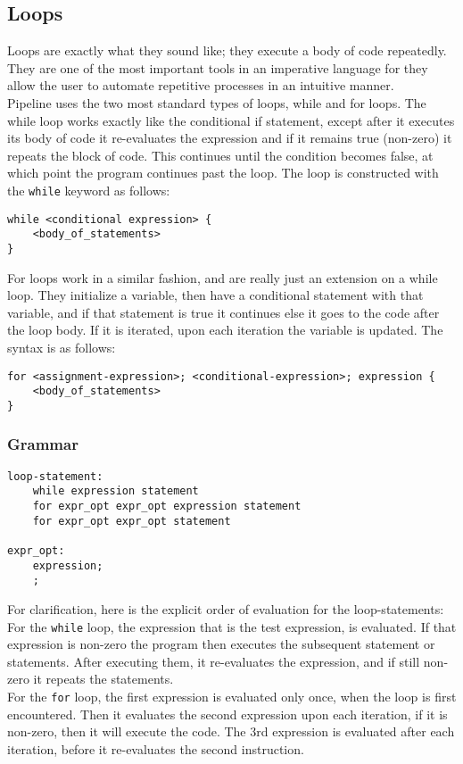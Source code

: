 \documentclass[./LRM_main.tex]{subfiles}
\begin{document}
\subsection{Loops}
Loops are exactly what they sound like; they execute a body of code repeatedly. They are one of the most important tools in an imperative language for they allow the user to automate repetitive processes in an intuitive manner.\\
Pipeline uses the two most standard types of loops, while and for loops. The while loop works exactly like the conditional if statement, except after it executes its body of code it re-evaluates the expression and if it remains true (non-zero) it repeats the block of code. This continues until the condition becomes false, at which point the program continues past the loop. The loop is constructed with the \texttt{while} keyword as follows:
\begin{lstlisting}
while <conditional expression> {
	<body_of_statements>
}
\end{lstlisting}
For loops work in a similar fashion, and are really just an extension on a while loop. They initialize a variable, then have a conditional statement with that variable, and if that statement is true it continues else it goes to the code after the loop body. If it is iterated, upon each iteration the variable is updated. The syntax is as follows:
\begin{lstlisting}
for <assignment-expression>; <conditional-expression>; expression {
	<body_of_statements>
}
\end{lstlisting}
\subsubsection{Grammar}
\begin{lstlisting}
loop-statement:
	while expression statement
	for expr_opt expr_opt expression statement
	for expr_opt expr_opt statement

expr_opt:
	expression;
	;	
\end{lstlisting}
For clarification, here is the explicit order of evaluation for the loop-statements:\\
For the \texttt{while} loop, the expression that is the test expression, is evaluated. If that expression is non-zero the program then executes the subsequent statement or statements. After executing them, it re-evaluates the expression, and if still non-zero it repeats the statements.\\
For the \texttt{for} loop, the first expression is evaluated only once, when the loop is first encountered. Then it evaluates the second expression upon each iteration, if it is non-zero, then it will execute the code. The 3rd expression is evaluated after each iteration, before it re-evaluates the second instruction.
\end{document}
